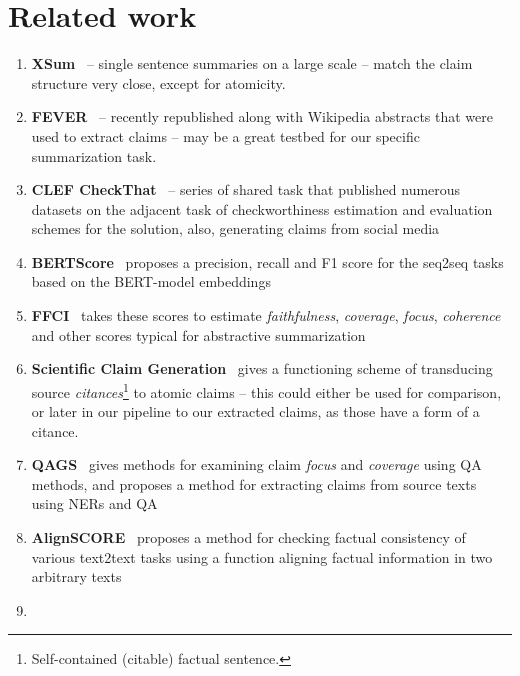 \section{Related work}\label{sec:related}

\begin{enumerate}
    \item \textbf{XSum}~\cite{narayan-etal-2018-dont} -- single sentence summaries on a large scale -- match the claim structure very close, except for atomicity.
    \item \textbf{FEVER}~\cite{fever-2022-fact,thorne-vlachos-2021-evidence} -- recently republished along with Wikipedia abstracts that were used to extract claims -- may be a great testbed for our specific summarization task.
    \item \textbf{CLEF CheckThat}~\cite{barroncedeno2020overview} -- series of shared task that published numerous datasets on the adjacent task of checkworthiness estimation and evaluation schemes for the solution, also, generating claims from social media
    \item \textbf{BERTScore}~\cite{bert-score} proposes a precision, recall and F1 score for the seq2seq tasks based on the BERT-model embeddings
    \item \textbf{FFCI}~\cite{ffci} takes these scores to estimate \textit{faithfulness}, \textit{coverage}, \textit{focus}, \textit{coherence} and other scores typical for abstractive summarization
    \item \textbf{Scientific Claim Generation}~\cite{wright-etal-2022-generating} gives a functioning scheme of transducing source \textit{citances}\footnote{Self-contained (citable) factual sentence.} to atomic claims -- this could either be used for comparison, or later in our pipeline to  our extracted claims, as those have a form of a citance.
    \item \textbf{QAGS}~\cite{wang-etal-2020-asking} gives methods for examining claim \textit{focus} and \textit{coverage} using QA methods, and proposes a method for extracting claims from source texts using NERs and QA
    \item \textbf{AlignSCORE}~\cite{zha-etal-2023-alignscore} proposes a method for checking factual consistency of various text2text tasks using a function aligning factual information in two arbitrary texts
    \item {}
\end{enumerate}

